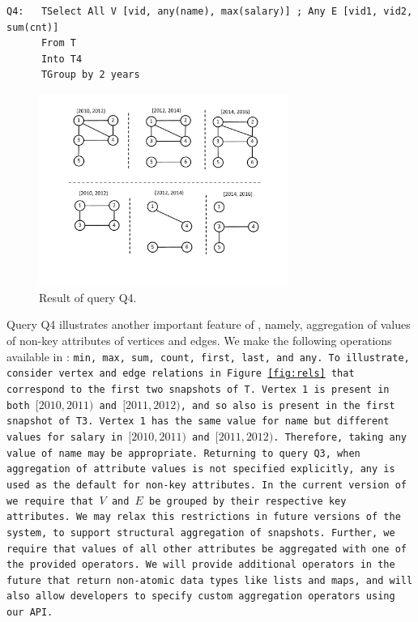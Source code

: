 \begin{verbatim}
Q4:   TSelect All V [vid, any(name), max(salary)] ; Any E [vid1, vid2, sum(cnt)] 
      From T 
      Into T4 
      TGroup by 2 years
\end{verbatim}

\begin{figure}
\includegraphics[width=3.2in]{figs/TGroupAll.pdf}
\caption{Result of query Q4.}
\label{fig:tg_all}
\end{figure}

Query Q4 illustrates another important feature of \ql, namely,
aggregation of values of non-key attributes of vertices and edges.  We
make the following operations available in \ql: \tt{min}, \tt{max},
\tt{sum}, \tt{count}, \tt{first}, \tt{last}, and \tt{any}.  To
illustrate, consider vertex and edge relations in
Figure~\ref{fig:rels} that correspond to the first two snapshots of
\tt{T}.  Vertex 1 is present in both $[2010, 2011)$ and $[2011,
    2012)$, and so also is present in the first snapshot of \tt{T3}.
    Vertex 1 has the same value for \tt{name} but different values for
    \tt{salary} in $[2010, 2011)$ and $[2011, 2012)$.  Therefore,
        taking any value of \tt{name} may be appropriate.  Returning
        to query Q3, when aggregation of attribute values is not
        specified explicitly, \tt{any} is used as the default for
        non-key attributes.  In the current version of \ql we require
        that $V$ and $E$ be grouped by their respective key
        attributes.  We may relax this restrictions in future versions
        of the system, to support structural aggregation of snapshots.
        Further, we require that values of all other attributes be
        aggregated with one of the provided operators.  We will
        provide additional operators in the future that return
        non-atomic data types like lists and maps, and will also allow
        developers to specify custom aggregation operators using our
        API.

